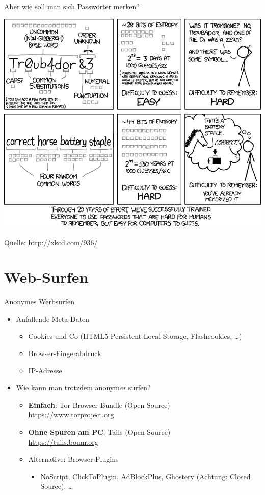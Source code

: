   \begin{frame}{Aber wie soll man sich Passwörter merken?}
    \begin{center}
      \includegraphics[width=0.9\textheight]{images/password_strength.png}\\
    \end{center}
    \tiny Quelle: \url{http://xkcd.com/936/}
  \end{frame}
\section{Web-Surfen}
  \begin{frame}{Anonymes Werbsurfen}
    \begin{itemize}
      \item Anfallende Meta-Daten
      \begin{itemize}
        \item Cookies und Co (HTML5 Persistent Local Storage, Flashcookies, \ldots)
        \item Browser-Fingerabdruck
        \item IP-Adresse
      \end{itemize}
      \item Wie kann man trotzdem anonym\textit{er} surfen?
      \begin{itemize}
        \item \textbf{Einfach}: Tor Browser Bundle (Open Source)\\ \url{https://www.torproject.org}\\[.5cm]
        \item \textbf{Ohne Spuren am PC}: Tails (Open Source)\\ \url{https://tails.boum.org}\\[.5cm]
        \item Alternative: Browser-Plugins
          \begin{itemize}
            \item NoScript, ClickToPlugin, AdBlockPlus, Ghostery (Achtung: Closed Source), \ldots 
          \end{itemize}
      \end{itemize}
    \end{itemize}
  \end{frame}

